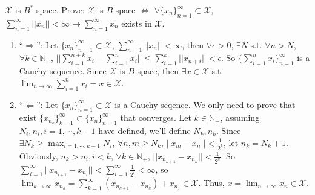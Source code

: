 \documentclass{ctexart}
\newif\ifpreface
\begin{document}
\large
\setlength{\baselineskip}{1.2em}
\ifpreface
    
\else
\maketitle
\fi
\renewcommand{\bar}{\overline}
\begin{problem}
    $\mathscr{X}$ is $B^*$ space. Prove: $\mathscr{X}$ is $B$ space $\iff$ $\forall \{x_n\}_{n=1}^{\infty}\subset \mathscr{X}$, $\sum_{n=1}^{\infty}||x_n||<\infty\rightarrow \sum_{n=1}^{\infty}x_n$ exists in $\mathscr{X}$.
\end{problem}
\begin{solution}
    \begin{enumerate}
        \item \enquote{$\Rightarrow$}: Let $\{x_n\}_{n=1}^{\infty}\subset \mathscr{X}$, $\sum_{n=1}^{\infty}||x_n||<\infty$, then $\forall \epsilon>0$, $\exists N$ s.t. $\forall n>N$, $\forall k\in \mathbb{N}_+$, $||\sum_{i=1}^{n+k}x_{i}-\sum_{i=1}^nx_i||\leq\sum_{i=1}^k||x_{n+i}||< \epsilon$. So $\{\sum_{i=1}^{n}x_i\}_{n=1}^{\infty}$ is a Cauchy sequence. Since $\mathscr{X}$ is $B$ space, then $\exists x\in \mathscr{X}$ s.t. $\lim_{n\to\infty}\sum_{i=1}^nx_i=x\in \mathscr{X}$.
        \item \enquote{$\Leftarrow$}: Let $\{x_n\}_{n=1}^{\infty}\subset \mathscr{X}$ is a Cauchy seqence. We only need to prove that exist $\{x_{n_k}\}_{k=1}^{\infty}\subset \{x_n\}_{n=1}^{\infty}$ that converges.
        Let $k\in \mathbb{N}_+$, assuming $N_i,n_i,i=1,\cdots, k-1$ have defined, we'll define $N_k,n_k$. Since $\exists N_k\geq \max_{i=1,\cdots, k-1}N_i$, $\forall n,m\geq N_k$, $||x_{m}-x_n||<\frac{1}{2^k}$, let $n_k=N_k+1$. 
        Obviously, $n_{k}>n_{i},i<k$,  $\forall k\in \mathbb{N}_+$, $||x_{n_{k+1}}-x_{n_k}||<\frac{1}{2^k}$. So $\sum_{i=1}^{\infty}||x_{n_{i+1}}-x_{n_{i}}||<\sum_{i=1}^{\infty}\frac{1}{2^i}<\infty$, so $\lim_{k\to\infty}x_{n_k}=\sum_{k=1}^{\infty}(x_{n_{k+1}}-x_{n_k})+x_{n_1}\in \mathscr{X}$. Thus, $x=\lim_{n\to\infty}x_n\in \mathscr{X}$.
        \end{enumerate}
\end{solution}
\end{document}
